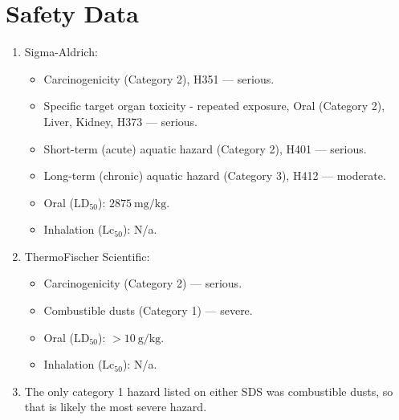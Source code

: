 \documentclass[titlepage]{article}
\begin{document}
\section*{Safety Data}
\begin{enumerate}
    \item Sigma-Aldrich:
    \begin{itemize}
        \item Carcinogenicity (Category 2), H351 --- serious.
        \item Specific target organ toxicity - repeated exposure, Oral (Category 2), Liver, Kidney, H373 --- serious.
        \item Short-term (acute) aquatic hazard (Category 2), H401 --- serious.
        \item Long-term (chronic) aquatic hazard (Category 3), H412 --- moderate.
        \item Oral ($\text{LD}_{50}$): $\SI[per-mode=symbol]{2875}{\milli\gram\per\kilo\gram}$.
        \item Inhalation ($\text{Lc}_{50}$): N/a.
    \end{itemize}
    
    \item ThermoFischer Scientific:
    \begin{itemize}
        \item Carcinogenicity (Category 2) --- serious.
        \item Combustible dusts (Category 1) --- severe.
        \item Oral ($\text{LD}_{50}$): $>\SI[per-mode=symbol]{10}{\gram\per\kilo\gram}$.
        \item Inhalation ($\text{Lc}_{50}$): N/a.
    \end{itemize}
    
    \item The only category 1 hazard listed on either SDS was combustible dusts, so that is likely the most severe hazard.
\end{enumerate}
\newpage



\printbibliography
\end{document}
